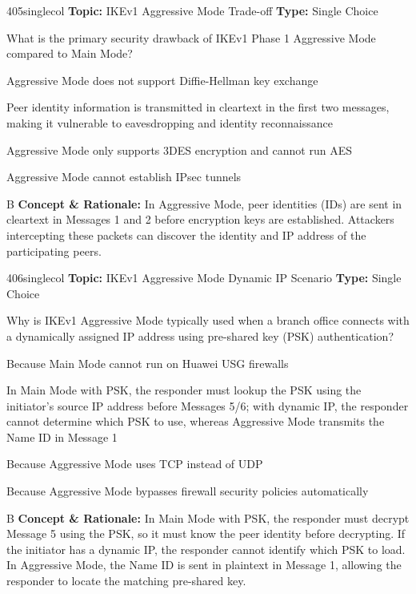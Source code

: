 \begin{qcard}{405}{singlecol}
\textcolor{darkslate!75}{\small\textbf{Topic:} IKEv1 Aggressive Mode Trade-off \hfill \textbf{Type:} Single Choice}\vspace{0.4em}\par
What is the primary security drawback of IKEv1 Phase 1 Aggressive Mode compared to Main Mode?
\begin{qoptions}
\item Aggressive Mode does not support Diffie-Hellman key exchange
\item Peer identity information is transmitted in cleartext in the first two messages, making it vulnerable to eavesdropping and identity reconnaissance
\item Aggressive Mode only supports 3DES encryption and cannot run AES
\item Aggressive Mode cannot establish IPsec tunnels
\end{qoptions}
\end{qcard}
\nopagebreak
\begin{explainbox}{B}
\textbf{Concept \& Rationale:} In Aggressive Mode, peer identities (IDs) are sent in cleartext in Messages 1 and 2 before encryption keys are established. Attackers intercepting these packets can discover the identity and IP address of the participating peers.
\end{explainbox}

\begin{qcard}{406}{singlecol}
\textcolor{darkslate!75}{\small\textbf{Topic:} IKEv1 Aggressive Mode Dynamic IP Scenario \hfill \textbf{Type:} Single Choice}\vspace{0.4em}\par
Why is IKEv1 Aggressive Mode typically used when a branch office connects with a dynamically assigned IP address using pre-shared key (PSK) authentication?
\begin{qoptions}
\item Because Main Mode cannot run on Huawei USG firewalls
\item In Main Mode with PSK, the responder must lookup the PSK using the initiator's source IP address before Messages 5/6; with dynamic IP, the responder cannot determine which PSK to use, whereas Aggressive Mode transmits the Name ID in Message 1
\item Because Aggressive Mode uses TCP instead of UDP
\item Because Aggressive Mode bypasses firewall security policies automatically
\end{qoptions}
\end{qcard}
\nopagebreak
\begin{explainbox}{B}
\textbf{Concept \& Rationale:} In Main Mode with PSK, the responder must decrypt Message 5 using the PSK, so it must know the peer identity before decrypting. If the initiator has a dynamic IP, the responder cannot identify which PSK to load. In Aggressive Mode, the Name ID is sent in plaintext in Message 1, allowing the responder to locate the matching pre-shared key.
\end{explainbox}


